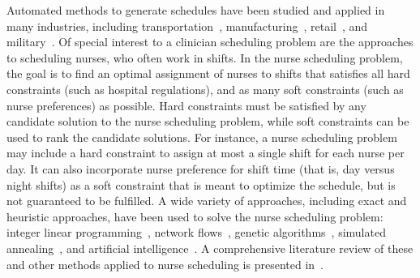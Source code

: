 Automated methods to generate schedules have been studied and applied in many
industries, including
transportation~\cite{aickelin_improved_2006, goel_truck_2012, gunther_combined_2010},
manufacturing~\cite{al-yakoob_mixed-integer_2007, al-yakoob_column_2008, alfares_simulation_2007},
retail~\cite{chapados_retail_2011, nissen_automatic_2010}, and
military~\cite{horn_scheduling_2007, laguna_modeling_2005}.
Of special interest to a clinician scheduling
problem are the approaches to scheduling nurses, who often work in shifts. In the
nurse scheduling problem, the goal is to find an optimal assignment of nurses to
shifts that satisfies all hard constraints (such as hospital regulations),
and as many soft constraints (such as nurse preferences) as possible.
Hard constraints must be satisfied by any candidate solution to the nurse scheduling problem,
while soft constraints can be used to rank the candidate solutions. 
For instance, a nurse scheduling problem may include a hard constraint to assign
at most a single shift for each nurse per day. It can also incorporate 
nurse preference for shift time (that is, day versus night shifts) as a soft constraint
that is meant to optimize the schedule, but is not guaranteed to be fulfilled.
A wide variety of approaches, including exact and heuristic approaches, have been
used to solve the nurse scheduling problem:
integer linear programming~\cite{azaiez_0-1_2005, trilling_nurse_2006, widyastiti_nurses_2016},
network flows~\cite{el_adoly_new_2018},
genetic algorithms~\cite{aickelin_exploiting_2000, jan_evolutionary_2000, kawanaka_genetic_2001},
simulated annealing~\cite{jaszkiewicz_metaheuristic_1997}, and
artificial intelligence~\cite{abdennadher_nurse_nodate, li_hybrid_2003}.
A comprehensive
literature review of these and other methods applied to nurse scheduling is
presented in~\cite{burke_state_2004}.


